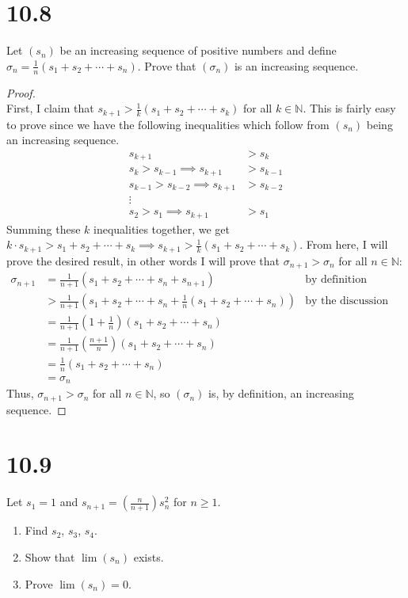 \documentclass[10pt,a4paper]{article}
\theoremstyle{definition}
\begin{document}
\section*{10.8}
Let $(s_n)$ be an increasing sequence of positive numbers and define $\displaystyle \sigma_n = \frac{1}{n}(s_1 + s_2 + \cdots + s_n).$ Prove that $(\sigma_n)$ is an increasing sequence.

\begin{proof}{$ $}
\\First, I claim that $s_{k + 1} > \frac{1}{k}(s_1 + s_2 + \cdots + s_k)$ for all $k \in \mathbb{N}$. This is fairly easy to prove since we have the following inequalities which follow from $(s_n)$ being an increasing sequence.
\begin{align*}
s_{k + 1} &> s_k\\
s_k > s_{k-1} \implies s_{k+1} &> s_{k-1}\\
s_{k-1} > s_{k-2} \implies s_{k+1} &> s_{k-2}\\
\vdots\\
s_2 > s_1 \implies s_{k+1} &> s_1
\end{align*}
Summing these $k$ inequalities together, we get $k\cdot s_{k+1} > s_1 + s_2 + \cdots + s_k \implies s_{k+1} > \frac{1}{k}(s_1 + s_2 + \cdots + s_k)$. From here, I will prove the desired result, in other words I will prove that $\sigma_{n + 1} > \sigma_n$ for all $n \in \mathbb{N}$:
\begin{align*}
\sigma_{n+1} &= \frac{1}{n+1}(s_1 + s_2 + \cdots + s_n + s_{n+1}) &\text{by definition}\\
&> \frac{1}{n+1}(s_1 + s_2 + \cdots + s_n + \frac{1}{n}(s_1 + s_2 + \cdots + s_{n})) &\text{by the discussion above}\\
&= \frac{1}{n+1}\left(1 + \frac{1}{n}\right)(s_1 + s_2 + \cdots + s_{n})\\
&= \frac{1}{n+1}\left(\frac{n + 1}{n}\right)(s_1 + s_2 + \cdots + s_{n})\\
&= \frac{1}{n}(s_1 + s_2 + \cdots + s_{n})\\
&= \sigma_{n}
\end{align*}
Thus, $\sigma_{n+1} > \sigma_n$ for all $n \in \mathbb{N}$, so $(\sigma_n)$ is, by definition, an increasing sequence.
\end{proof}

\section*{10.9}
Let $s_1 = 1$ and $\displaystyle s_{n + 1} = \left(\frac{n}{n+1}\right) s_n^2$ for $n \geq 1$.
\begin{enumerate}[label = (\alph*)]
\item Find $s_2$, $s_3$, $s_4$.
\item Show that $\lim(s_n)$ exists.
\item Prove $\lim(s_n) = 0$.
\end{enumerate}
\end{document}

